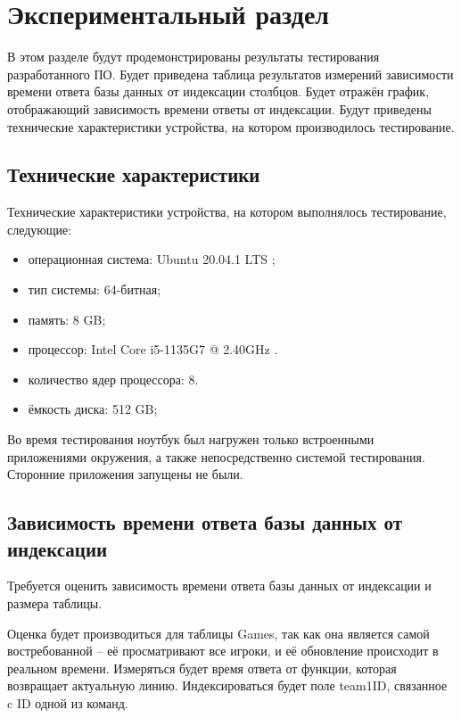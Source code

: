 \section{Экспериментальный раздел}
В этом разделе будут продемонстрированы результаты тестирования разработанного ПО.
Будет приведена таблица результатов измерений зависимости времени ответа базы данных от индексации столбцов.
Будет отражён график, отображающий зависимость времени ответы от индексации.
Будут приведены технические характеристики устройства, на котором производилось тестирование.

\subsection{Технические характеристики}
Технические характеристики устройства, на котором выполнялось тестирование, следующие:
\begin{itemize}
	\item операционная система: Ubuntu 20.04.1 LTS \cite{ubuntu};
	\item тип системы: 64-битная;
	\item память: 8 GB;
	\item процессор: Intel Core i5-1135G7 @ 2.40GHz \cite{intel}.
	\item количество ядер процессора: 8.
	\item ёмкость диска: 512 GB;
\end{itemize}

Во время тестирования ноутбук был нагружен только встроенными приложениями окружения, а также непосредственно системой тестирования. 
Сторонние приложения запущены не были.

\subsection{Зависимость времени ответа базы данных от индексации}
Требуется оценить зависимость времени ответа базы данных от индексации и размера таблицы.

Оценка будет производиться для таблицы Games, так как она является самой востребованной -- её просматривают все игроки, и её обновление происходит в реальном времени. 
Измеряться будет время ответа от функции, которая возвращает актуальную линию. 
Индексироваться будет поле team1ID, связанное c ID одной из команд.

